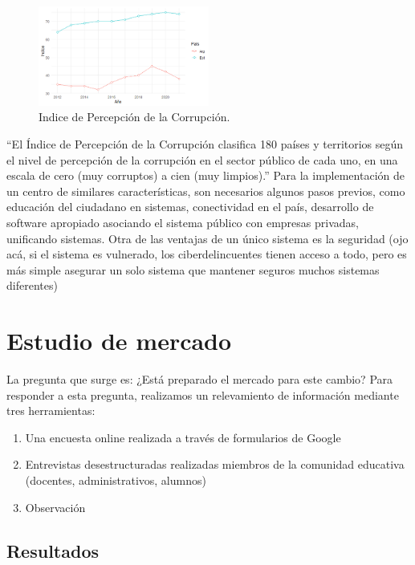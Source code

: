 \documentclass[a4paper]{article}
\begin{document}
\begin{figure}
\centering
\includegraphics[width=0.5\textwidth]{Imagen1.png}
\caption{\label{fig:Imagen1}Indice de Percepción de la Corrupción.}
\end{figure}

“El Índice de Percepción de la Corrupción clasifica 180 países y territorios según el nivel de percepción de la corrupción en el sector público de cada uno, en una escala de cero (muy corruptos) a cien (muy limpios).”
Para la implementación de un centro de similares características, son necesarios algunos pasos previos, como educación del ciudadano en sistemas, conectividad en el país, desarrollo de software apropiado asociando el sistema público con empresas privadas, unificando sistemas. Otra de las ventajas de un único sistema es la seguridad (ojo acá, si el sistema es vulnerado, los ciberdelincuentes tienen acceso a todo, pero es más simple asegurar un solo sistema que mantener seguros muchos sistemas diferentes)   

\section{Estudio de mercado}

La pregunta que surge es: ¿Está preparado el mercado para este cambio? Para responder a esta pregunta, realizamos un relevamiento de información mediante tres herramientas: 

\begin{enumerate}
\item Una encuesta online realizada a través de formularios de Google
\item Entrevistas desestructuradas realizadas miembros de la comunidad educativa (docentes, administrativos, alumnos)
\item Observación
\end{enumerate}

\subsection{Resultados}
\end{document}
